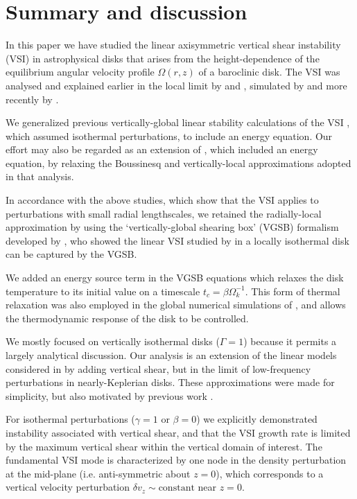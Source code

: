 \section{Summary and discussion}
In this paper we have studied the linear axisymmetric vertical shear
instability (VSI) in astrophysical disks that arises from the
height-dependence of the equilibrium angular velocity profile
$\Omega(r,z)$ of a baroclinic  disk. The VSI was analysed and
explained earlier in the local limit by \cite{urpin98} and
\cite{urpin03}, simulated by \cite{arlt04} and more  recently by
\cite{nelson13}.     

We generalized previous vertically-global linear stability calculations
of the VSI \citep{nelson13,mcnally14}, which assumed
isothermal perturbations, to include an energy equation. Our effort
may also be regarded as an extension of \cite{urpin03}, which 
included an energy equation, by relaxing the Boussinesq and  
vertically-local approximations adopted in that analysis.  

In accordance with the above studies, which show that the VSI   
applies to perturbations with small radial lengthscales, we retained
the radially-local approximation by using the `vertically-global
shearing box' (VGSB) formalism developed by \cite{mcnally14}, who 
showed the linear VSI studied by \cite{nelson13} in a locally
isothermal disk can be captured by the VGSB. 


We added an energy source term in the VGSB equations which relaxes the disk
temperature to its initial value on a timescale
$t_c=\beta\Omega_k^{-1}$. This form of thermal relaxation was also 
employed in the global numerical simulations of \cite{nelson13}, and allows
the thermodynamic response of the disk to be controlled. 

We mostly focused on vertically isothermal disks ($\Gamma=1$) because
it permits a largely analytical discussion. Our analysis is an
extension of the linear models considered in \cite{lubow93} by
adding vertical shear, but in the limit of low-frequency
perturbations in nearly-Keplerian disks. These approximations were
made for simplicity, but also motivated by previous work
\citep{nelson13}.   

For isothermal perturbations ($\gamma=1$ or $\beta=0$) we explicitly
demonstrated instability  associated with vertical shear, and that the
VSI growth rate is limited by the maximum vertical shear within the
vertical domain of interest. The fundamental VSI mode is characterized
by one node in the density perturbation at the mid-plane
(i.e. anti-symmetric about $z=0$), which corresponds to a vertical
velocity perturbation  $\delta v_z\sim\mathrm{constant}$ near $z=0$.  

